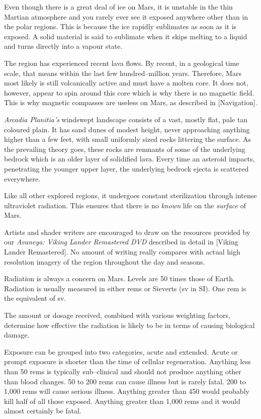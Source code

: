 Even though there is a great deal of ice on Mars, it is unstable in the thin Martian atmosphere and you rarely ever see it exposed anywhere other than in the polar regions. This is because the ice rapidly sublimates as soon as it is exposed. A solid material is said to sublimate when it skips melting to a liquid and turns directly into a vapour state. 

The region has experienced recent lava flows. By recent, in a geological time scale, that means within the last few hundred--million years. Therefore, Mars most likely is still volcanically active and must have a molten core. It does not, however, appear to spin around this core which is why there is no magnetic field. This is why magnetic compasses are useless on Mars, as described in [Navigation].

{\it Arcadia Planitia's} windswept landscape consists of a vast, mostly flat, pale tan coloured plain. It has sand dunes of modest height, never approaching anything higher than a few feet, with small uniformly sized rocks littering the surface. As the prevailing theory goes, these rocks are remnants of some of the underlying bedrock which is an older layer of solidified lava. Every time an asteroid impacts, penetrating the younger upper layer, the underlying bedrock ejecta is scattered everywhere.

Like all other explored regions, it undergoes constant sterilization through intense ultraviolet radiation. This ensures that there is no {\it known} life on the {\it surface} of Mars.

Artists and shader writers are encouraged to draw on the resources provided by our {\it Avaneya: Viking Lander Remastered DVD} described in detail in [Viking Lander Remastered]. No amount of writing really compares with actual high resolution imagery of the region throughout the day and seasons.


Radiation is always a concern on Mars. Levels are 50 times those of Earth. Radiation is usually measured in either rems or Sieverts (sv in SI). One rem is the equivalent of  sv.

The amount or dosage received, combined with various weighting factors, determine how effective the radiation is likely to be in terms of causing biological damage.

Exposure can be grouped into two categories, acute and extended. Acute or prompt exposure is shorter than the time of cellular regeneration. Anything less than 50 rems is typically sub--clinical and should not produce anything other than blood changes. 50 to 200 rems can cause illness but is rarely fatal. 200 to 1,000 rems will cause serious illness. Anything greater than 450 would probably kill half of all those exposed. Anything greater than 1,000 rems and it would almost certainly be fatal.

